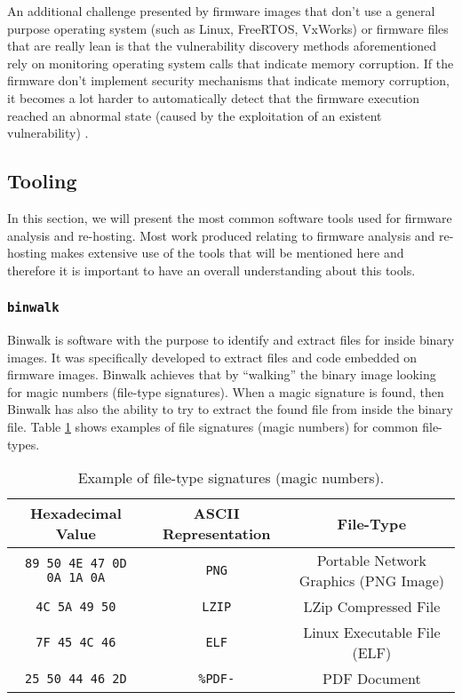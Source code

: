 An additional challenge presented by firmware images that don't use a general purpose operating system (such as Linux, FreeRTOS, VxWorks) or firmware files that are really lean is that the vulnerability discovery methods aforementioned rely on monitoring operating system calls that indicate memory corruption. If the firmware don't implement security mechanisms that indicate memory corruption, it becomes a lot harder to automatically detect that the firmware execution reached an abnormal state (caused by the exploitation of an existent vulnerability) \cite{wycinwyc}.

\subsection{Tooling}

In this section, we will present the most common software tools used for firmware analysis and re-hosting. Most work produced relating to firmware analysis and re-hosting makes extensive use of the tools that will be mentioned here and therefore it is important to have an overall understanding about this tools.

\subsubsection{ {\tt binwalk} }

Binwalk \cite{github:binwalk} is software with the purpose to identify and extract files for inside binary images. It was specifically developed to extract files and code embedded on firmware images. Binwalk achieves that by ``walking'' the binary image looking for magic numbers (file-type signatures). When a magic signature is found, then Binwalk has also the ability to try to extract the found file from inside the binary file. Table \ref{tab:magic-numbers} shows examples of file signatures (magic numbers) for common file-types.

\begin{table}[h]
\centering
\caption{Example of file-type signatures (magic numbers).}
\begin{tabular}{ccc}
\hline
\textbf{Hexadecimal Value}                                 & \textbf{ASCII Representation}                & \textbf{File-Type}                   \\ \hline
{\tt \footnotesize 89 50 4E 47 0D 0A 1A 0A}                & {\tt PNG}                     & Portable Network Graphics (PNG Image)\\ 
{\tt \footnotesize 4C 5A 49 50}                            & {\tt LZIP}                    & LZip Compressed File                 \\
{\tt \footnotesize 7F 45 4C 46}                            & {\tt ELF}                     & Linux Executable File (ELF)          \\
{\tt \footnotesize 25 50 44 46 2D}                         & {\tt \%PDF-}                  & PDF Document                         \\ 
\hline
\end{tabular}
\label{tab:magic-numbers}
\end{table}


